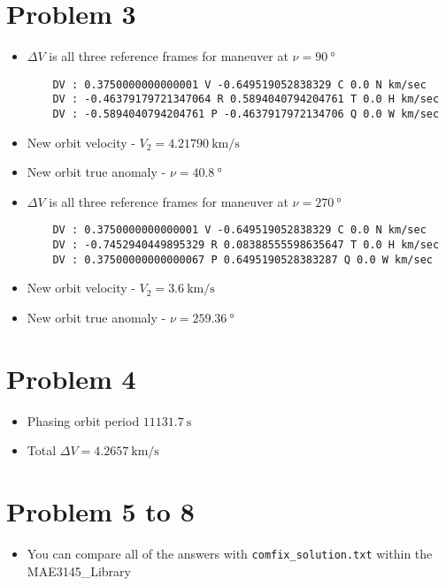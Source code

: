 \documentclass[10pt]{article}
\theoremstyle{definition}
\begin{document}
\section*{Problem 3}
\begin{itemize}
    \item \( \Delta V \) is all three reference frames for maneuver at \( \nu = \SI{90}{\degree}\)
        \begin{verbatim}
    DV : 0.3750000000000001 V -0.649519052838329 C 0.0 N km/sec
    DV : -0.46379179721347064 R 0.5894040794204761 T 0.0 H km/sec
    DV : -0.5894040794204761 P -0.4637917972134706 Q 0.0 W km/sec
        \end{verbatim}
    \item New orbit velocity - \( V_2 = \SI{4.21790}{\kilo\meter\per\second}\)
    \item New orbit true anomaly - \( \nu = \SI{40.8}{\degree}\)
    \item \( \Delta V \) is all three reference frames for maneuver at \( \nu = \SI{270}{\degree}\)
        \begin{verbatim}
    DV : 0.3750000000000001 V -0.649519052838329 C 0.0 N km/sec
    DV : -0.7452940449895329 R 0.08388555598635647 T 0.0 H km/sec
    DV : 0.37500000000000067 P 0.6495190528383287 Q 0.0 W km/sec
        \end{verbatim}
    \item New orbit velocity - \( V_2 = \SI{3.6}{\kilo\meter\per\second}\)
    \item New orbit true anomaly - \( \nu = \SI{259.36}{\degree}\)
\end{itemize}

\section*{Problem 4}
\begin{itemize}
    \item Phasing orbit period \( \SI{11131.7}{\second}\)
    \item Total \( \Delta V = \SI{4.2657}{\kilo\meter\per\second}\) 
\end{itemize}

\section*{Problem 5 to 8}
\begin{itemize}
    \item You can compare all of the answers with \texttt{comfix\_solution.txt} within the MAE3145\_Library
\end{itemize}
\end{document}

